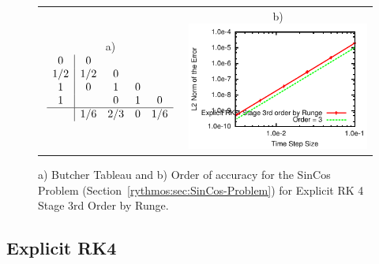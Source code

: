 \begin{figure}[H]
\centering{}%
\begin{tabular}{cc}
a)$\begin{array}{c|cccc}
0 & 0\\
1/2 & 1/2 & 0\\
1 & 0 & 1 & 0\\
1 &  & 0 & 1 & 0\\
\hline  & 1/6 & 2/3 & 0 & 1/6
\end{array}$ & b)\includegraphics[scale=1.5]{figures/ERK_4Stage3OrderRunge}\tabularnewline
\end{tabular}\caption{a) Butcher Tableau and b) Order of accuracy for the SinCos Problem
(Section~\ref{rythmos:sec:SinCos-Problem}) for Explicit RK 4 Stage
3rd Order by Runge.\label{rythmos:tab:ButcherTableau-ERK_4Stage3OrderRunge}}
\end{figure}



\subsection{Explicit RK4}

